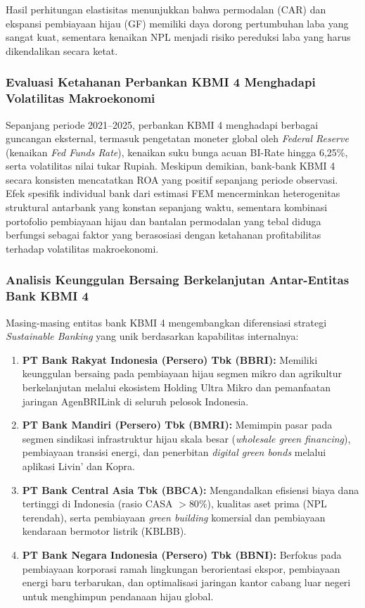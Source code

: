 \documentclass[12pt,a4paper]{article}
\numberwithin{equation}{section}
\begin{document}
\noindent
Hasil perhitungan elastisitas menunjukkan bahwa permodalan (CAR) dan ekspansi pembiayaan hijau (GF) memiliki daya dorong pertumbuhan laba yang sangat kuat, sementara kenaikan NPL menjadi risiko pereduksi laba yang harus dikendalikan secara ketat.

\subsubsection{Evaluasi Ketahanan Perbankan KBMI 4 Menghadapi Volatilitas Makroekonomi}
\noindent
Sepanjang periode 2021--2025, perbankan KBMI 4 menghadapi berbagai guncangan eksternal, termasuk pengetatan moneter global oleh \emph{Federal Reserve} (kenaikan \emph{Fed Funds Rate}), kenaikan suku bunga acuan BI-Rate hingga 6,25\%, serta volatilitas nilai tukar Rupiah. Meskipun demikian, bank-bank KBMI 4 secara konsisten mencatatkan ROA yang positif sepanjang periode observasi. Efek spesifik individual bank dari estimasi FEM mencerminkan heterogenitas struktural antarbank yang konstan sepanjang waktu, sementara kombinasi portofolio pembiayaan hijau dan bantalan permodalan yang tebal diduga berfungsi sebagai faktor yang berasosiasi dengan ketahanan profitabilitas terhadap volatilitas makroekonomi.

\subsubsection{Analisis Keunggulan Bersaing Berkelanjutan Antar-Entitas Bank KBMI 4}
\noindent
Masing-masing entitas bank KBMI 4 mengembangkan diferensiasi strategi \emph{Sustainable Banking} yang unik berdasarkan kapabilitas internalnya:
\begin{enumerate}
  \item \textbf{PT Bank Rakyat Indonesia (Persero) Tbk (BBRI):} Memiliki keunggulan bersaing pada pembiayaan hijau segmen mikro dan agrikultur berkelanjutan melalui ekosistem Holding Ultra Mikro dan pemanfaatan jaringan AgenBRILink di seluruh pelosok Indonesia.
  \item \textbf{PT Bank Mandiri (Persero) Tbk (BMRI):} Memimpin pasar pada segmen sindikasi infrastruktur hijau skala besar (\emph{wholesale green financing}), pembiayaan transisi energi, dan penerbitan \emph{digital green bonds} melalui aplikasi Livin' dan Kopra.
  \item \textbf{PT Bank Central Asia Tbk (BBCA):} Mengandalkan efisiensi biaya dana tertinggi di Indonesia (rasio CASA $>80\%$), kualitas aset prima (NPL terendah), serta pembiayaan \emph{green building} komersial dan pembiayaan kendaraan bermotor listrik (KBLBB).
  \item \textbf{PT Bank Negara Indonesia (Persero) Tbk (BBNI):} Berfokus pada pembiayaan korporasi ramah lingkungan berorientasi ekspor, pembiayaan energi baru terbarukan, dan optimalisasi jaringan kantor cabang luar negeri untuk menghimpun pendanaan hijau global.
\end{enumerate}
\end{document}
